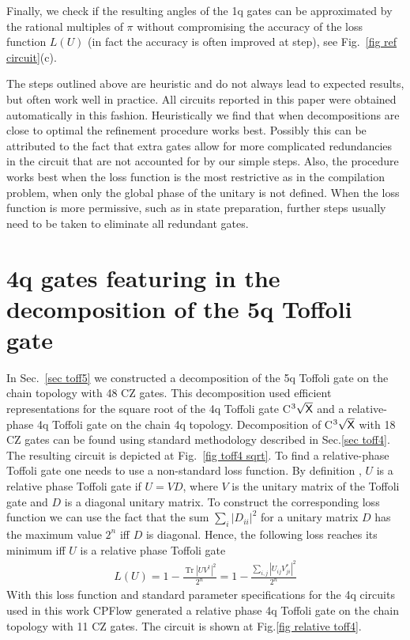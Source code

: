 \documentclass[draft, twocolumn, amsfonts, amssymb, aps, nofootinbib]{revtex4-2}
\newcommand{\CZ}{\textsf{CZ }}
\newcommand{\package}[1]{\textrm {#1 }}
\newcommand{\cpflow}{\package{CPFlow}}
\begin{document}
Finally, we check if the resulting angles of the 1q gates can be approximated by the rational multiples of $\pi$ without compromising the accuracy of the loss function $L(U)$ (in fact the accuracy is often improved at step), see Fig.~\ref{fig ref circuit}(c).

The steps outlined above are heuristic and do not always lead to expected results, but often work well in practice. All circuits reported in this paper were obtained automatically in this fashion. Heuristically we find that when decompositions are close to optimal the refinement procedure works best. Possibly this can be attributed to the fact that extra gates allow for more complicated redundancies in the circuit that are not accounted for by our simple steps. Also, the procedure works best when the loss function is the most restrictive as in the compilation problem, when only the global phase of the unitary is not defined. When the loss function is more permissive, such as in state preparation, further steps usually need to be taken to eliminate all redundant gates.

\section{4q gates featuring in the decomposition of the 5q Toffoli gate \label{app 5q}}
In Sec.~\ref{sec toff5} we constructed a decomposition of the 5q Toffoli gate on the chain topology with 48 \CZ gates. This decomposition used efficient representations for the square root of the 4q Toffoli gate \textsf{C}${}^3\sqrt{\text{\textsf{X}}}$ and a relative-phase 4q Toffoli gate on the chain 4q topology. Decomposition of \textsf{C}${}^3\sqrt{\text{\textsf{X}}}$ with 18 \CZ gates can be found using standard methodology described in Sec.\ref{sec toff4}. The resulting circuit is depicted at Fig.~\ref{fig toff4 sqrt}. To find a relative-phase Toffoli gate one needs to use a non-standard loss function. By definition \cite{Maslov}, $U$ is a relative phase Toffoli gate if $U=VD$, where $V$ is the unitary matrix of the Toffoli gate and $D$ is a diagonal unitary matrix. To construct the corresponding loss function we can use the fact that the sum $\sum_i|D_{ii}|^2$ for a unitary matrix $D$ has the maximum value $2^n$ iff $D$ is diagonal. Hence, the following loss reaches its minimum iff $U$ is a relative phase Toffoli gate
\begin{align}
L(U)=1-\frac{\operatorname{Tr}\left|UV^\dagger\right|^2}{2^n}=1-\frac{\sum_{i, j}\left|U_{ij}V^*_{ji}\right|^2}{2^n}
\end{align}
With this loss function and standard parameter specifications for the 4q circuits used in this work \cpflow generated a relative phase 4q Toffoli gate on the chain topology with 11 \CZ gates. The circuit is shown at Fig.\ref{fig relative toff4}.


\end{document}
